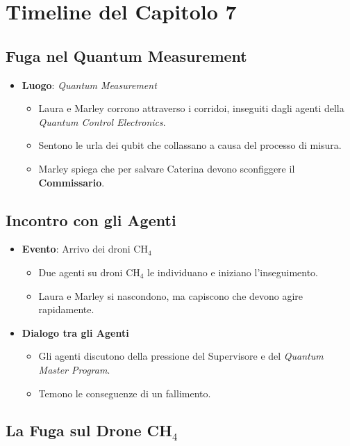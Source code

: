 \section*{Timeline del Capitolo 7}

\subsection*{Fuga nel Quantum Measurement}

\begin{itemize}
    \item \textbf{Luogo}: \emph{Quantum Measurement}
    \begin{itemize}
        \item Laura e Marley corrono attraverso i corridoi, inseguiti dagli agenti della \emph{Quantum Control Electronics}.
        \item Sentono le urla dei qubit che collassano a causa del processo di misura.
        \item Marley spiega che per salvare Caterina devono sconfiggere il \textbf{Commissario}.
    \end{itemize}
\end{itemize}

\subsection*{Incontro con gli Agenti}

\begin{itemize}
    \item \textbf{Evento}: Arrivo dei droni CH$_4$
    \begin{itemize}
        \item Due agenti su droni CH$_4$ le individuano e iniziano l'inseguimento.
        \item Laura e Marley si nascondono, ma capiscono che devono agire rapidamente.
    \end{itemize}
    \item \textbf{Dialogo tra gli Agenti}
    \begin{itemize}
        \item Gli agenti discutono della pressione del Supervisore e del \emph{Quantum Master Program}.
        \item Temono le conseguenze di un fallimento.
    \end{itemize}
\end{itemize}

\subsection*{La Fuga sul Drone CH$_4$}

